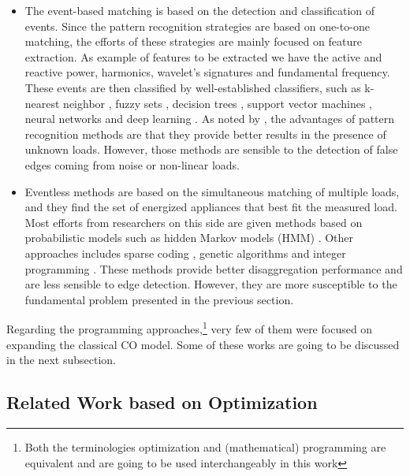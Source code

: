 \begin{itemize}

    \item The event-based  matching  is  based  on  the  detection  and  classification  of  events. Since the pattern recognition strategies are based on one-to-one matching, the efforts of these strategies are mainly focused on feature extraction. As example of features to be extracted we have the active and reactive power, harmonics, wavelet's signatures and fundamental frequency. These events are then classified by well-established classifiers, such as k-nearest neighbor \cite{Figueiredo2011, berges2009, Froehlich2010}, fuzzy sets \cite{lin2011, ducange2014}, decision trees \cite{Nguyen2015, gillis2016}, support vector machines \cite{duarte2012, zoha2012}, neural networks \cite{zhou2016, bian2016} and deep learning \cite{mauch2016, jack2015}. As noted by \cite{zeifman}, the advantages of pattern recognition methods are that they provide better results in the presence of unknown loads. However, those methods are sensible to the detection of false edges coming from noise or non-linear loads.
    
    \item Eventless methods are based on the simultaneous matching of multiple loads, and they find the set of energized appliances that best fit the measured load. Most efforts from researchers on this side are given methods based on probabilistic models such as hidden Markov models (HMM) \cite{afhmm, reed, hmm_unsup, stephen_hmm}. Other approaches includes sparse coding \cite{sparse_kolter, nmf}, genetic algorithms \cite{meta} and integer programming \cite{suzuki, bhotto2016}. These methods provide better disaggregation performance \cite{zeifman} and are less sensible to edge detection. However, they are more susceptible to the fundamental problem presented in the previous section. 

\end{itemize}


Regarding the programming approaches,\footnote{Both the terminologies optimization and (mathematical) programming are equivalent and are going to be used interchangeably in this work} very few of them were focused on expanding the classical CO model. Some of these works are going to be discussed in the next subsection.  

\subsection{Related Work based on Optimization}

